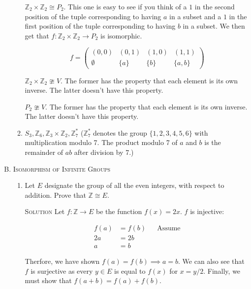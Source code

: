 \documentclass[twoside]{amsart}
\newcommand{\solution}{\textsc{Solution}\xspace}
\newcommand{\iso}{\cong}
\newcommand{\niso}{\ncong}
\newcommand{\blank}{\vspace{5pt}}
\begin{document}
\begin{enumerate}[A.]
\begin{enumerate}[1]
      $\mathbb{Z}_2 \times \mathbb{Z}_2 \iso P_2$. This one is easy
      to see if you think of a $1$ in the second position of the
      tuple corresponding to having $a$ in a subset and a $1$ in the
      first position of the tuple corresponding to having $b$ in a
      subset. We then get that $f : \mathbb{Z}_2 \times \mathbb{Z}_2
      \to P_2$ is isomorphic.

      \[
         f =
            \begin{pmatrix}
               (0,0)     & (0,1) & (1,0) & (1,1) \\
               \emptyset & \{a\} & \{b\} & \{a,b\}
            \end{pmatrix}
      \]

      $\mathbb{Z}_2 \times \mathbb{Z}_2 \niso V$. The former
      has the property that each element is its own inverse. The
      latter doesn't have this property.

      $P_2 \niso V$. The former has the property that each element
      is its own inverse. The latter doesn't have this property.

      \blank
      \item $S_3, \mathbb{Z}_6, \mathbb{Z}_3 \times \mathbb{Z}_2,
      \mathbb{Z}_7^*$ ($\mathbb{Z}_7^*$ denotes the group
      $\{1,2,3,4,5,6\}$ with multiplication modulo 7. The product
      modulo 7 of $a$ and $b$ is the remainder of $ab$ after
      division by 7.)
   \end{enumerate}

   \item \textsc{Isomorphism of Infinite Groups}
   \begin{enumerate}[1]
      \item Let $E$ designate the group of all the even integers, with
      respect to addition. Prove that $\mathbb{Z} \iso E$.

      \blank \noindent \solution Let $f : \mathbb{Z} \to E$ be the function
      $f(x) = 2x$. $f$ is injective:

      \setcounter{equation}{0}
      \begin{align}
         f(a) &= f(b)      && \text{Assume} \\
         2a   &= 2b \\
          a   &= b    
      \end{align}

      Therfore, we have shown $f(a)=f(b) \implies a=b$. We can also
      see that $f$ is surjective as every $y \in E$ is equal to $f(x)$
      for $x = y/2$. Finally, we must show that $f(a+b)=f(a)+f(b)$.


\end{enumerate}
\end{enumerate}
\end{document}
